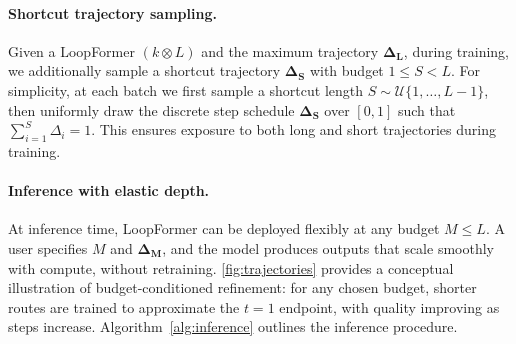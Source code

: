 \paragraph{Shortcut trajectory sampling.}
Given a LoopFormer $(k \otimes L)$ and the maximum trajectory $\boldsymbol{\Delta_L}$, during training, we additionally sample a shortcut trajectory $\boldsymbol{\Delta_S}$ with budget $1 \le S < L$. For simplicity, at each batch we first sample a shortcut length $S \sim \mathcal{U}\{1, \ldots, L-1\}$, then uniformly draw the discrete step schedule $\boldsymbol{\Delta_S}$ over $[0,1]$ such that $\sum_{i=1}^S \Delta_i = 1$. This ensures exposure to both long and short trajectories during training.

\paragraph{Inference with elastic depth.}
At inference time, LoopFormer can be deployed flexibly at any budget $M \le L$. A user specifies $M$ and  $\boldsymbol{\Delta_M}$, and the model produces outputs that scale smoothly with compute, without retraining. \autoref{fig:trajectories} provides a conceptual illustration of budget-conditioned refinement: for any chosen budget, shorter routes are trained to approximate the $t{=}1$ endpoint, with quality improving as steps increase. Algorithm~\ref{alg:inference} outlines the inference procedure.








